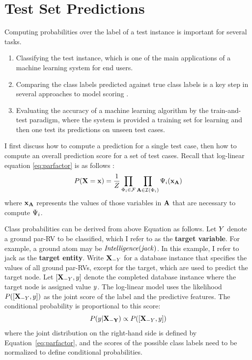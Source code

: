 \documentclass{sfuthesis}
\begin{document}
\section{Test Set Predictions} Computing probabilities over the label of a test instance is important for several tasks. 
\begin{enumerate}
\item Classifying the test instance, which is one of the main applications of a machine learning system for end users.
\item Comparing the class labels predicted against true class labels is a key step in several approaches to model scoring \cite{Kimmig2015}. 
\item Evaluating the accuracy of a machine learning algorithm by the train-and-test paradigm, where the system is provided a training set for learning and then one test its predictions on unseen test cases. 
\end{enumerate}

I  first discuss how to compute a prediction for a single test case, then how to compute an overall prediction score for a set of test cases. 
Recall that log-linear equation \ref{eq:parfactor} is as follows \cite[Eq.7]{Kimmig2015}:
\begin{equation} \nonumber
P(\mathbf{X}=\mathbf{x}) = \frac{1}{Z} \prod_{\Phi_{i} \in \mathcal{F}} \prod_{\mathbf{A} \in \mathcal{I}(\Phi_{i})} 
\Psi_{i}(\mathbf{x}_{\mathbf{A}}) 
\end{equation}
where $\mathbf{x}_{\mathbf{A}}$ represents the values of those variables in $\mathbf{A}$ that are necessary to compute $\Psi_{i}$. 

Class probabilities can be derived from above Equation as follows.
Let $Y$ denote a ground par-RV to be classified, which I  refer to as the \textbf{target variable}. For example, a ground atom may be $\it{Intelligence}(jack)$. In this example, I  refer to jack as the \textbf{target entity}. Write $\mathbf{X}_{-Y}$ for a database instance that specifies the values of all ground par-RVs, except for the target, which are used to predict the target node. Let $[\mathbf{X}_{-Y},y]$ denote the completed database instance where the target node is assigned value $y$. The log-linear model uses the likelihood $P([\mathbf{X}_{-Y},y])$ as the joint score of the label and the predictive features. The conditional probability is proportional to this score:
\begin{equation} \label{eq:classify}
P(y|\mathbf{X_{-Y}}) \propto P([\mathbf{X}_{-Y},y])
\end{equation}
where the joint distribution on the right-hand side is defined by Equation~\ref{eq:parfactor}, and the scores of the possible class labels need to be normalized to define  conditional probabilities. 
\end{document}
